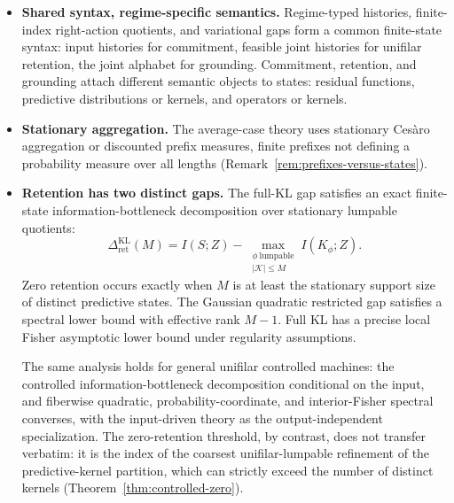 \documentclass[12pt]{article}
\theoremstyle{definition}
\newcommand{\RetKL}{\Delta_{\mathrm{ret}}^{\mathrm{KL}}}
\begin{document}
\begin{itemize}[leftmargin=1.8em]
\item \textbf{Shared syntax, regime-specific semantics.}
Regime-typed histories, finite-index right-action quotients, and variational
gaps form a common finite-state syntax: input histories for commitment,
feasible joint histories for unifilar retention, the joint alphabet for
grounding.  Commitment, retention, and grounding attach different semantic
objects to states: residual functions, predictive distributions or kernels,
and operators or kernels.

\item \textbf{Stationary aggregation.}
The average-case theory uses stationary Ces\`aro aggregation or discounted
prefix measures, finite prefixes not defining a probability measure over all
lengths (Remark~\ref{rem:prefixes-versus-states}).

\item \textbf{Retention has two distinct gaps.}
The full-KL gap satisfies an exact finite-state information-bottleneck
decomposition over stationary lumpable quotients:
\[
\RetKL(M)
=
I(S;Z)
-
\max_{\substack{
\phi\ \text{lumpable}\\
|\mathcal K|\le M
}}
I(K_\phi;Z).
\]
Zero retention occurs exactly when $M$ is at least the stationary support size
of distinct predictive states.  The Gaussian quadratic restricted gap satisfies
a spectral lower bound with effective rank $M-1$.  Full KL has a precise local
Fisher asymptotic lower bound under regularity assumptions.

The same analysis holds for general unifilar controlled machines: the
controlled information-bottleneck decomposition conditional on the input, and
fiberwise quadratic, probability-coordinate, and interior-Fisher spectral
converses, with the input-driven theory as the output-independent
specialization.  The zero-retention threshold, by contrast, does not transfer
verbatim: it is the index of the coarsest unifilar-lumpable refinement of the
predictive-kernel partition, which can strictly exceed the number of distinct
kernels (Theorem~\ref{thm:controlled-zero}).


\end{itemize}
\end{document}
